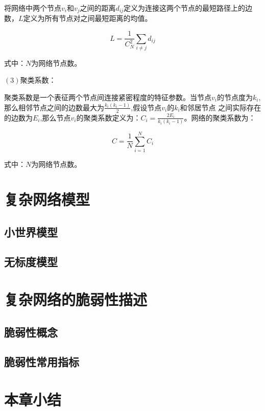将网络中两个节点$v_i$和$v_j$之间的距离$d_{ij}$定义为连接这两个节点的最短路径上的边数，$L$定义为所有节点对之间最短距离的均值。

\begin{equation}
    \label{equ:chap3:feature}
    L=\frac{1}{C_N^2} \sum_{i \neq j} d_{i j}
\end{equation}

式中：$N$为网络节点数。

$(3)$聚类系数：

聚类系数是一个表征两个节点间连接紧密程度的特征参数。当节点$v_i$的节点度为$k_i$,那么相邻节点之间的边数最大为$\frac{k_i(k_i-1)}{2}$,假设节点$v_i$的$k_i$和邻居节点
之间实际存在的边数为$E_i$,那么节点$v_i$的聚类系数定义为：$C_i=\frac{2E_i}{k_i(k_i-1)}$。网络的聚类系数为：

\begin{equation}
    \label{equ:chap3:feature}
    C=\frac{1}{N} \sum_{i=1}^N C_i
\end{equation}

式中：$N$为网络节点数。


\section{复杂网络模型}
\label{sec:wind}


\subsection{小世界模型}
\label{sec:windEffects}



\subsection{无标度模型}
\label{sec:windModel}



\section{复杂网络的脆弱性描述}
\label{sec:load}



\subsection{脆弱性概念}
\label{sec:loadEffect}




\subsection{脆弱性常用指标}
\label{sec:loadModel}




\section{本章小结}
\label{sec:sum2}





